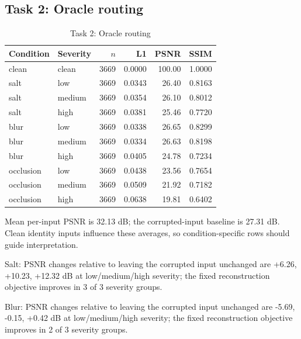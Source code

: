 \documentclass[conference]{IEEEtran}
\begin{document}
\subsection{Task 2: Oracle routing}

\begin{table}[!ht]\centering\caption{Task 2: Oracle routing}\scriptsize

\begin{tabular}{llrrrr}\toprule Condition & Severity & $n$ & L1 & PSNR & SSIM\\\midrule

clean & clean & 3669 & 0.0000 & 100.00 & 1.0000\\

salt & low & 3669 & 0.0343 & 26.40 & 0.8163\\

salt & medium & 3669 & 0.0354 & 26.10 & 0.8012\\

salt & high & 3669 & 0.0381 & 25.46 & 0.7720\\

blur & low & 3669 & 0.0338 & 26.65 & 0.8299\\

blur & medium & 3669 & 0.0334 & 26.63 & 0.8198\\

blur & high & 3669 & 0.0405 & 24.78 & 0.7234\\

occlusion & low & 3669 & 0.0438 & 23.56 & 0.7654\\

occlusion & medium & 3669 & 0.0509 & 21.92 & 0.7182\\

occlusion & high & 3669 & 0.0638 & 19.81 & 0.6402\\

\bottomrule\end{tabular}\end{table}

Mean per-input PSNR is 32.13 dB; the corrupted-input baseline is 27.31 dB. Clean identity inputs influence these averages, so condition-specific rows should guide interpretation.

Salt: PSNR changes relative to leaving the corrupted input unchanged are +6.26, +10.23, +12.32 dB at low/medium/high severity; the fixed reconstruction objective improves in 3 of 3 severity groups.

Blur: PSNR changes relative to leaving the corrupted input unchanged are -5.69, -0.15, +0.42 dB at low/medium/high severity; the fixed reconstruction objective improves in 2 of 3 severity groups.
\end{document}
